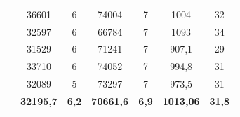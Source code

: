 \documentclass[pdftex,12pt,a4paper]{report}
\begin{document}
\begin{table}[!htb]
{\begin{tabular}{l|c|c|c|c|c|c|}
                                                            & 36601                                                          & 6                                         & 74004                                              & 7                                         & 1004                                        & 32                                        \\ \cline{2-7} 
                                                            & 32597                                                          & 6                                         & 66784                                              & 7                                         & 1093                                        & 34                                        \\ \cline{2-7} 
                                                            & 31529                                                          & 6                                         & 71241                                              & 7                                         & 907,1                                       & 29                                        \\ \cline{2-7} 
                                                            & 33710                                                          & 6                                         & 74052                                              & 7                                         & 994,8                                       & 31                                        \\ \cline{2-7} 
                                                            & 32089                                                          & 5                                         & 73297                                              & 7                                         & 973,5                                       & 31                                        \\ \hline
\rowcolor[HTML]{FFFC9E} 
\multicolumn{1}{|c|}{\cellcolor[HTML]{F8A102}\textbf{média}} & {\color[HTML]{333333} \textbf{32195,7}}                        & {\color[HTML]{333333} \textbf{6,2}}       & {\color[HTML]{333333} \textbf{70661,6}}            & {\color[HTML]{333333} \textbf{6,9}}       & {\color[HTML]{333333} \textbf{1013,06}}     & {\color[HTML]{333333} \textbf{31,8}}      \\ \hline
\end{tabular}}
\end{table}
\end{document}
